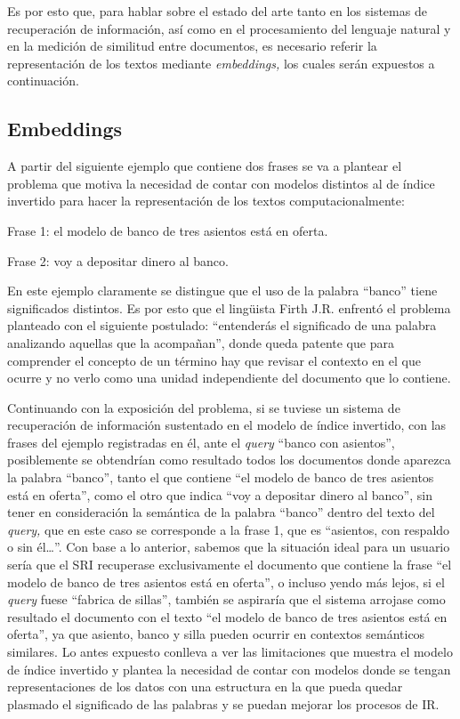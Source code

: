 \documentclass[
  12pt,
  openany]{book}
\begin{document}
Es por esto que, para hablar sobre el estado del arte tanto en los sistemas de recuperación de información, así como en el procesamiento del lenguaje natural y en la medición de similitud entre documentos, es necesario referir la representación de los textos mediante \emph{embeddings,} los cuales serán expuestos a continuación.

\hypertarget{embed}{%
\subsection{Embeddings}\label{embed}}

A partir del siguiente ejemplo que contiene dos frases se va a plantear el problema que motiva la necesidad de contar con modelos distintos al de índice invertido para hacer la representación de los textos computacionalmente:

Frase 1: el modelo de banco de tres asientos está en oferta.

Frase 2: voy a depositar dinero al banco.

En este ejemplo claramente se distingue que el uso de la palabra ``banco'' tiene significados distintos. Es por esto que el lingüista Firth J.R. enfrentó el problema planteado con el siguiente postulado: ``entenderás el significado de una palabra analizando aquellas que la acompañan'', donde queda patente que para comprender el concepto de un término hay que revisar el contexto en el que ocurre y no verlo como una unidad independiente del documento que lo contiene.

Continuando con la exposición del problema, si se tuviese un sistema de recuperación de información sustentado en el modelo de índice invertido, con las frases del ejemplo registradas en él, ante el \emph{query} ``banco con asientos'', posiblemente se obtendrían como resultado todos los documentos donde aparezca la palabra ``banco'', tanto el que contiene ``el modelo de banco de tres asientos está en oferta'', como el otro que indica ``voy a depositar dinero al banco'', sin tener en consideración la semántica de la palabra ``banco'' dentro del texto del \emph{query,} que en este caso se corresponde a la frase 1, que es ``asientos, con respaldo o sin él\ldots{}''. Con base a lo anterior, sabemos que la situación ideal para un usuario sería que el SRI recuperase exclusivamente el documento que contiene la frase ``el modelo de banco de tres asientos está en oferta'', o incluso yendo más lejos, si el \emph{query} fuese ``fabrica de sillas'', también se aspiraría que el sistema arrojase como resultado el documento con el texto ``el modelo de banco de tres asientos está en oferta'', ya que asiento, banco y silla pueden ocurrir en contextos semánticos similares. Lo antes expuesto conlleva a ver las limitaciones que muestra el modelo de índice invertido y plantea la necesidad de contar con modelos donde se tengan representaciones de los datos con una estructura en la que pueda quedar plasmado el significado de las palabras y se puedan mejorar los procesos de IR.
\end{document}
